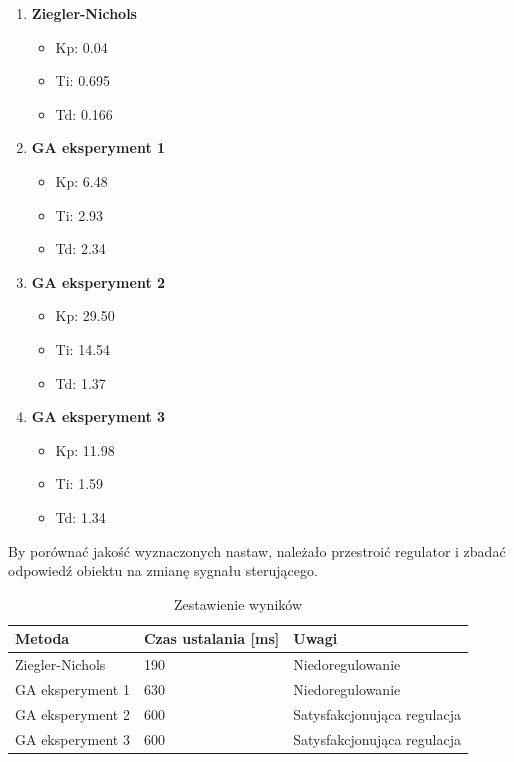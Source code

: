\documentclass[12pt,twoside]{article}
\begin{document}
\begin{enumerate}[label=\alph*), leftmargin=1.25cm]
    \item \textbf{Ziegler-Nichols}
    \begin{itemize}
        \item Kp: 0.04
        \item Ti: 0.695
        \item Td: 0.166
    \end{itemize}
    
    \item \textbf{GA eksperyment 1}
    \begin{itemize}
        \item Kp: 6.48
        \item Ti: 2.93
        \item Td: 2.34
    \end{itemize}
    	
	\item \textbf{GA eksperyment 2}
    \begin{itemize}
        \item Kp: 29.50
        \item Ti: 14.54
        \item Td: 1.37
    \end{itemize}    	
    	
    	\item \textbf{GA eksperyment 3}
    \begin{itemize}
        \item Kp: 11.98
        \item Ti: 1.59
        \item Td: 1.34
    \end{itemize} 
    
\end{enumerate}
%
%
%
By porównać jakość wyznaczonych nastaw, należało przestroić regulator i zbadać odpowiedź obiektu na zmianę sygnału sterującego.
\begin{table}[ht]
\caption{Zestawienie wyników}
\centering		
	\begin{tabular}{|p{}|p{}|p{}|}	
		\hline
		Metoda & Czas ustalania [ms] & Uwagi \\
		\hline
		Ziegler-Nichols & 190 & Niedoregulowanie \\
		\hline
		GA eksperyment 1 & 630 & Niedoregulowanie \\
		\hline
		GA eksperyment 2 & 600 & Satysfakcjonująca regulacja \\
		\hline
		GA eksperyment 3 & 600 & Satysfakcjonująca regulacja \\
		\hline

	\end{tabular}	
	
\label{Tab:PID_comparision}
\end{table}	
\end{document}
